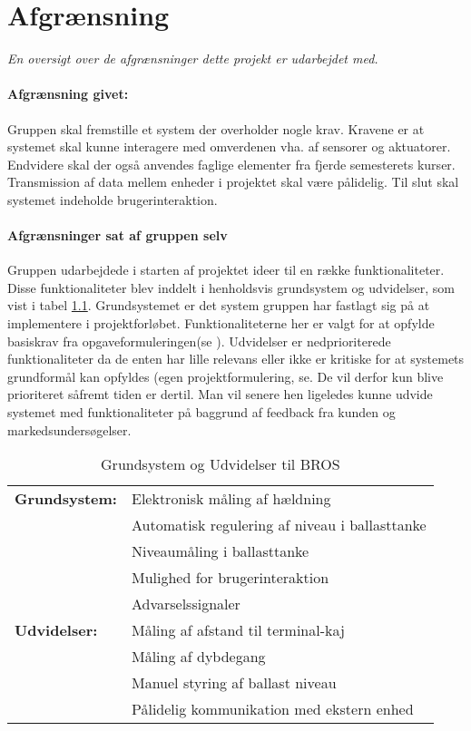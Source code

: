 \chapter{Afgrænsning}
\label{ch:afgraensning}
\textit{En oversigt over de afgrænsninger dette projekt er udarbejdet med.}
\subsubsection{Afgrænsning givet:}
Gruppen skal fremstille et system der overholder nogle krav. Kravene er at systemet skal kunne interagere med omverdenen vha. af sensorer og aktuatorer. Endvidere skal der også anvendes faglige elementer fra fjerde semesterets kurser. Transmission af data mellem enheder i projektet skal være pålidelig. Til slut skal systemet indeholde brugerinteraktion. 
\subsubsection{Afgrænsninger sat af gruppen selv}
Gruppen udarbejdede i starten af projektet ideer til en række funktionaliteter. Disse funktionaliteter blev inddelt i henholdsvis grundsystem og udvidelser, som vist i tabel \ref{tabel:Grundogudvid}.
Grundsystemet er det system gruppen har fastlagt sig på at implementere i projektforløbet. Funktionaliteterne her er valgt for at opfylde basiskrav fra opgaveformuleringen(se ).
Udvidelser er nedprioriterede funktionaliteter da de enten har lille relevans eller ikke er kritiske for at systemets grundformål kan opfyldes (egen projektformulering, se. De vil derfor kun blive prioriteret såfremt tiden er dertil. 
Man vil senere hen ligeledes kunne udvide systemet med funktionaliteter på baggrund af feedback fra kunden og markedsundersøgelser.

\begin{table}[H]
\centering
\begin{tabular}{|l|l|}
\hline
\textbf{Grundsystem:} &Elektronisk måling af hældning\\
 &Automatisk regulering af niveau i ballasttanke\\
 &Niveaumåling i ballasttanke\\
 &Mulighed for brugerinteraktion\\
 &Advarselssignaler\\\hline
\textbf{Udvidelser:} &Måling af afstand til terminal-kaj\\
 &Måling af dybdegang\\
 &Manuel styring af ballast niveau\\
 &Pålidelig kommunikation med ekstern enhed\\\hline
\end{tabular}
\caption{Grundsystem og Udvidelser til BROS}
\label{tabel:Grundogudvid}
\end{table}